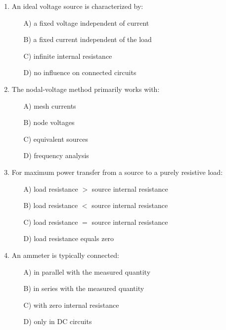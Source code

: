 \documentclass[a4paper,12pt]{article}
\newif\ifshowsolutions
\begin{document}
\begin{enumerate}[label=\textbf{\arabic*.}, leftmargin=*, itemsep=8pt]
\ifshowsolutions
Solution: B
\fi

  \item An ideal voltage source is characterized by:
    \begin{itemize}[label=$\square$]
      \item[A)] a fixed voltage independent of current
      \item[B)] a fixed current independent of the load
      \item[C)] infinite internal resistance
      \item[D)] no influence on connected circuits
    \end{itemize}

\ifshowsolutions
Solution: A
\fi

  \item The nodal-voltage method primarily works with:
    \begin{itemize}[label=$\square$]
      \item[A)] mesh currents
      \item[B)] node voltages
      \item[C)] equivalent sources
      \item[D)] frequency analysis
    \end{itemize}

\ifshowsolutions
Solution: B
\fi

  \item For maximum power transfer from a source to a purely resistive load:
    \begin{itemize}[label=$\square$]
      \item[A)] load resistance $>$ source internal resistance
      \item[B)] load resistance $<$ source internal resistance
      \item[C)] load resistance $=$ source internal resistance
      \item[D)] load resistance equals zero
    \end{itemize}

\ifshowsolutions
Solution: C
\fi

  \item An ammeter is typically connected:
    \begin{itemize}[label=$\square$]
      \item[A)] in parallel with the measured quantity
      \item[B)] in series with the measured quantity
      \item[C)] with zero internal resistance
      \item[D)] only in DC circuits
    \end{itemize}


\end{enumerate}
\end{document}
